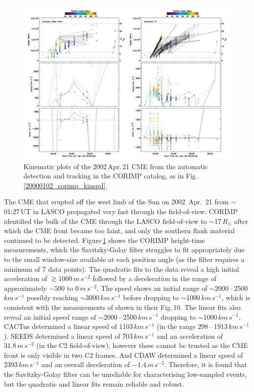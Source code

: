 \documentclass[referee,a4paper,12pt,traditabstract]{swsc}
\begin{document}
\begin{linenumbers}
\begin{figure}[t]
\centerline{\includegraphics[width=\linewidth]{images/20020421_corimp_kinspd.pdf}}
\caption{Kinematic plots of the 2002\,Apr.\,21 CME from the automatic detection and tracking in the CORIMP catalog, as in Fig.\,\ref{20000102_corimp_kinspd}.}
\label{20020421_corimp_kinspd}
\end{figure}


The CME that erupted off the west limb of the Sun on 2002~Apr.~21 from $\sim$01:27\,UT in LASCO propagated very fast through the field-of-view. CORIMP identified the bulk of the CME through the LASCO field-of-view to $\sim$17\,$R_\odot$ after which the CME front became too faint, and only the southern flank material continued to be detected. Figure\,\ref{20020421_corimp_kinspd} shows the CORIMP height-time measurements, which the Savitzky-Golay filter struggles to fit appropriately due to the small window-size available at each position angle (as the filter requires a minimum of 7 data points). The quadratic fits to the data reveal a high initial acceleration of $\gtrsim$1000\,$m\,s^{-2}$ followed by a deceleration in the range of approximately $-500$ to $0\,m\,s^{-2}$. The speed shows an initial range of $\sim$2000\,--\,2500\,$km\,s^{-1}$ possibly reaching $\sim$3000\,$km\,s^{-1}$ before dropping to $\sim$1000\,$km\,s^{-1}$, which is consistent with the measurements of \cite{2009A&A...495..325B} shown in their Fig.\,10. The linear fits also reveal an initial speed range of $\sim$2000\,--\,2500\,$km\,s^{-1}$ dropping to $\sim$1000\,$km\,s^{-1}$. CACTus determined a linear speed of 1103$\,km\,s^{-1}$ (in the range 298\,--\,1913\,$km\,s^{-1}$). SEEDS determined a linear speed of 703\,$km\,s^{-1}$ and an acceleration of $31.8\,m\,s^{-2}$ (in the C2 field-of-view), however these cannot be trusted as the CME front is only visible in two C2 frames. And CDAW determined a linear speed of 2393$\,km\,s^{-1}$ and an overall deceleration of $-1.4\,m\,s^{-2}$. Therefore, it is found that the Savitzky-Golay filter can be unreliable for characterising low-sampled events, but the quadratic and linear fits remain reliable and robust.



\end{linenumbers}
\end{document}
